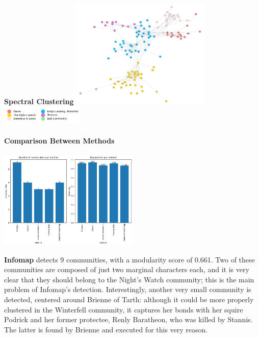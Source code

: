 \documentclass[10pt,twocolumn,letterpaper]{article}
\begin{document}
\begin{center}
    \textbf{Spectral Clustering}
    \includegraphics[width=0.5\textwidth]{img/s5/communities_sc.jpg}
    \includegraphics[width=0.3\textwidth]{img/s5/sc_legend.jpg}\\
    \caption{\small{$\#communities=6$, $modularity=0.634$}}
\end{center}

\paragraph{Comparison Between Methods}

\begin{center}
    \includegraphics[width=0.5\textwidth]{img/s5/communities_comparison.jpg}
\end{center}

\textbf{Infomap} detects 9 communities, with a modularity score of 0.661. Two of these communities are composed of just two marginal characters each, and it is very clear that they should belong to the Night's Watch community; this is the main problem of Infomap's detection. Interestingly, another very small community is detected, centered around Brienne of Tarth: although it could be more properly clustered in the Winterfell community, it captures her bonds with her squire Podrick and her former protectee, Renly Baratheon, who was killed by Stannis. The latter is found by Brienne and executed for this very reason. \\
\end{document}
